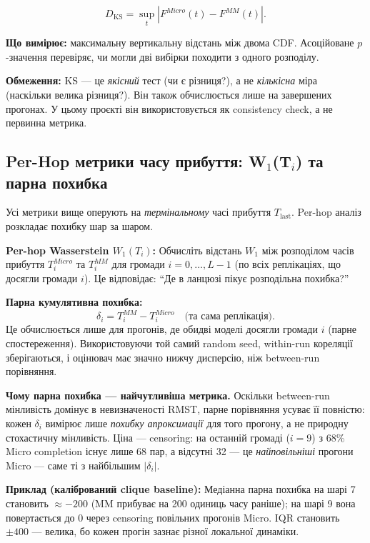 \documentclass[11pt,a4paper]{article}
\begin{document}
\[
  D_{\mathrm{KS}} = \sup_t |F^{Micro}(t) - F^{MM}(t)|.
\]

\textbf{Що вимірює:} максимальну вертикальну відстань між двома CDF.
Асоційоване $p$-значення перевіряє, чи могли дві вибірки походити з
одного розподілу.

\textbf{Обмеження:} KS --- це \emph{якісний} тест (чи є різниця?),
а не \emph{кількісна} міра (наскільки велика різниця?).  Він також
обчислюється лише на завершених прогонах.  У цьому проєкті він використовується як
consistency check, а не первинна метрика.

\subsection{Per-Hop метрики часу прибуття: W\texorpdfstring{$_1$}{1}(T\texorpdfstring{$_i$}{i}) та парна похибка}

Усі метрики вище оперують на \emph{термінальному} часі прибуття $T_{\mathrm{last}}$.
Per-hop аналіз розкладає похибку шар за шаром.

\textbf{Per-hop Wasserstein $W_1(T_i)$:}
Обчисліть відстань $W_1$ між розподілом часів прибуття
$T_i^{Micro}$ та $T_i^{MM}$ для громади $i = 0,\ldots,L-1$
(по всіх реплікаціях, що досягли громади $i$).
Це відповідає: ``Де в ланцюзі пікує розподільна похибка?''

\textbf{Парна кумулятивна похибка:}
\[
  \delta_i = T_i^{MM} - T_i^{Micro} \quad \text{(та сама реплікація)}.
\]
Це обчислюється лише для прогонів, де обидві моделі досягли громади $i$
(парне спостереження).  Використовуючи той самий random seed, within-run кореляції
зберігаються, і оцінювач має значно нижчу дисперсію, ніж between-run
порівняння.

\textbf{Чому парна похибка --- найчутливіша метрика.}
Оскільки between-run мінливість домінує в невизначеності RMST,
парне порівняння усуває її повністю: кожен $\delta_i$ вимірює лише
\emph{похибку апроксимації} для того прогону, а не природну стохастичну
мінливість.  Ціна --- censoring: на останній громаді ($i=9$) з
68\% Micro completion існує лише 68 пар, а відсутні 32 --- це
\emph{найповільніші} прогони Micro --- саме ті з найбільшим $|\delta_i|$.

\textbf{Приклад (калібрований clique baseline):}
Медіанна парна похибка на шарі 7 становить $\approx -200$ (MM прибуває
на 200 одиниць часу раніше); на шарі 9 вона повертається до 0 через
censoring повільних прогонів Micro.  IQR становить $\pm 400$ --- велика, бо
кожен прогін зазнає різної локальної динаміки.
\end{document}
